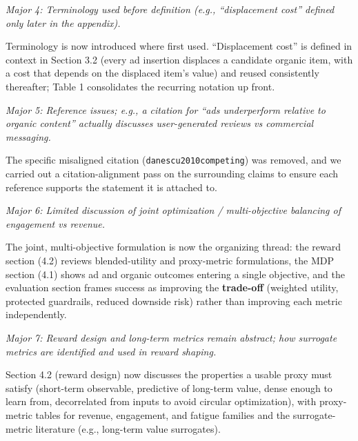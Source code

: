 \documentclass[11pt]{article}
\newenvironment{revcomment}
  {\par\smallskip\noindent\begin{list}{}{%
      \setlength{\leftmargin}{1.5em}\setlength{\rightmargin}{1em}}%
   \item\itshape\color{black!75}}
  {\end{list}\par\smallskip}
\begin{document}
\begin{revcomment}
Major 4: Terminology used before definition (e.g., ``displacement cost''
defined only later in the appendix).
\end{revcomment}

Terminology is now introduced where first used. ``Displacement cost'' is
defined in context in Section 3.2 (every ad insertion displaces a candidate
organic item, with a cost that depends on the displaced item's value) and
reused consistently thereafter; Table 1 consolidates the recurring notation up
front.

\begin{revcomment}
Major 5: Reference issues; e.g., a citation for ``ads underperform relative to
organic content'' actually discusses user-generated reviews vs commercial
messaging.
\end{revcomment}

The specific misaligned citation (\texttt{danescu2010competing}) was removed,
and we carried out a citation-alignment pass on the surrounding claims to ensure
each reference supports the statement it is attached to.

\begin{revcomment}
Major 6: Limited discussion of joint optimization / multi-objective balancing
of engagement vs revenue.
\end{revcomment}

The joint, multi-objective formulation is now the organizing thread: the reward
section (4.2) reviews blended-utility and proxy-metric formulations, the MDP
section (4.1) shows ad and organic outcomes entering a single objective, and the
evaluation section frames success as improving the \textbf{trade-off} (weighted
utility, protected guardrails, reduced downside risk) rather than improving each
metric independently.

\begin{revcomment}
Major 7: Reward design and long-term metrics remain abstract; how surrogate
metrics are identified and used in reward shaping.
\end{revcomment}

Section 4.2 (reward design) now discusses the properties a usable proxy must
satisfy (short-term observable, predictive of long-term value, dense enough to
learn from, decorrelated from inputs to avoid circular optimization), with
proxy-metric tables for revenue, engagement, and fatigue families and the
surrogate-metric literature (e.g., long-term value surrogates).
\end{document}
